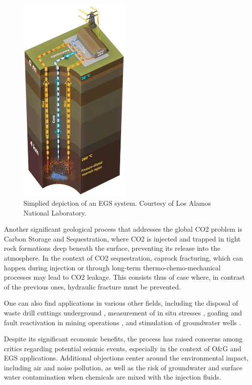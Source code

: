 \begin{figure}
    \includegraphics[width=5.5cm]{Chapter1/geothermal.png}
    \caption{Simplied depiction of an EGS system. Courtesy of Los Alamos National Laboratory.}\label{egs-wrap}
\end{figure} 

Another significant geological process that addresses the global CO2 problem is Carbon Storage and Sequestration, where CO2 is injected and trapped in tight rock formations deep beneath the surface, preventing its release into the atmosphere. In the context of CO2 sequestration, caprock fracturing, which can happen during injection or through long-term thermo-chemo-mechanical processes may lead to CO2 leakage.\cite{pan2014tough} This consists thus of case where, in contrast of the previous ones, hydraulic fracture must be prevented. 

One can also find applications in various other fields, including the disposal of waste drill cuttings underground \cite{moschovidis_mounds_2000}, measurement of in situ stresses \cite{desroches_stress_1995, desroches1993modelling}, goafing and fault reactivation in mining operations \cite{board_fluid_1992, zhang_propagation_2002}, and stimulation of groundwater wells \cite{noauthor_permeability_nodate,less_hydrofracture_1994}.

Despite its significant economic benefits, the process has raised concerns among critics regarding potential seismic events, especially in the context of O\&G and EGS applications. Additional objections center around the environmental impact, including air and noise pollution, as well as the risk of groundwater and surface water contamination when chemicals are mixed with the injection fluids.

